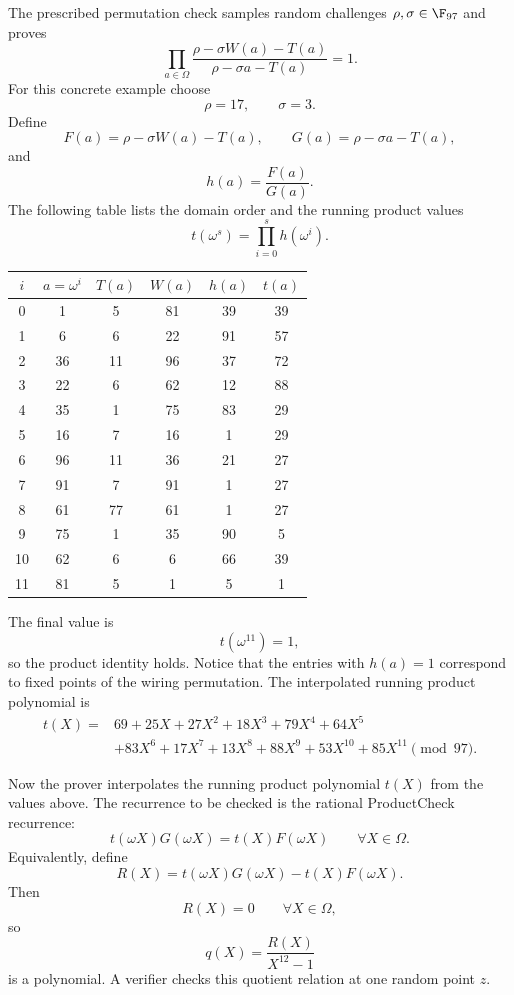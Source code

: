 The prescribed permutation check samples random challenges $\rho,\sigma\in\F_{97}$ and proves
\[
    \prod_{a\in\Omega}
    \frac{\rho-\sigma W(a)-T(a)}{\rho-\sigma a-T(a)}=1.
\]
For this concrete example choose
\[
    \rho=17,
    \qquad
    \sigma=3.
\]
Define
\[
    F(a)=\rho-\sigma W(a)-T(a),
    \qquad
    G(a)=\rho-\sigma a-T(a),
\]
and
\[
    h(a)=\frac{F(a)}{G(a)}.
\]
The following table lists the domain order and the running product values
\[
    t(\omega^s)=\prod_{i=0}^{s}h(\omega^i).
\]

\begin{center}
\small
\begin{tabular}{c|c|c|c|c|c}
\toprule
$i$ & $a=\omega^i$ & $T(a)$ & $W(a)$ & $h(a)$ & $t(a)$\\
\midrule
0 & 1 & 5 & 81 & 39 & 39\\
1 & 6 & 6 & 22 & 91 & 57\\
2 & 36 & 11 & 96 & 37 & 72\\
3 & 22 & 6 & 62 & 12 & 88\\
4 & 35 & 1 & 75 & 83 & 29\\
5 & 16 & 7 & 16 & 1 & 29\\
6 & 96 & 11 & 36 & 21 & 27\\
7 & 91 & 7 & 91 & 1 & 27\\
8 & 61 & 77 & 61 & 1 & 27\\
9 & 75 & 1 & 35 & 90 & 5\\
10 & 62 & 6 & 6 & 66 & 39\\
11 & 81 & 5 & 1 & 5 & 1\\
\bottomrule
\end{tabular}
\end{center}

The final value is
\[
    t(\omega^{11})=1,
\]
so the product identity holds. Notice that the entries with $h(a)=1$ correspond to fixed points of the wiring permutation. The interpolated running product polynomial is
\[
\begin{aligned}
t(X)={}&69+25X+27X^2+18X^3+79X^4+64X^5\\
&+83X^6+17X^7+13X^8+88X^9+53X^{10}+85X^{11}
\pmod{97}.
\end{aligned}
\]

Now the prover interpolates the running product polynomial $t(X)$ from the values above. The recurrence to be checked is the rational ProductCheck recurrence:
\[
    t(\omega X)G(\omega X)=t(X)F(\omega X)
    \qquad\forall X\in\Omega.
\]
Equivalently, define
\[
    R(X)=t(\omega X)G(\omega X)-t(X)F(\omega X).
\]
Then
\[
    R(X)=0\qquad\forall X\in\Omega,
\]
so
\[
    q(X)=\frac{R(X)}{X^{12}-1}
\]
is a polynomial. A verifier checks this quotient relation at one random point $z$.

